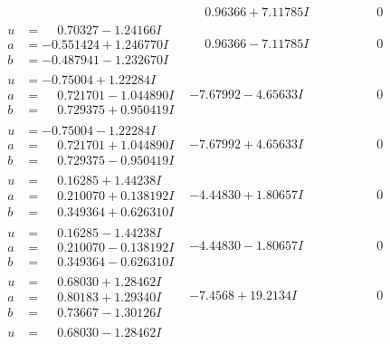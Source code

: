 \documentclass[1p]{elsarticle_modified}
\theoremstyle{definition}
\begin{document}
$$\begin{array}{c|c|c}
 & \phantom{-}0.96366 + 7.11785 I & \phantom{-0.000000 } 0 \\ \hline\begin{aligned}
u &= \phantom{-}0.70327 - 1.24166 I \\
a &= -0.551424 + 1.246770 I \\
b &= -0.487941 - 1.232670 I\end{aligned}
 & \phantom{-}0.96366 - 7.11785 I & \phantom{-0.000000 } 0 \\ \hline\begin{aligned}
u &= -0.75004 + 1.22284 I \\
a &= \phantom{-}0.721701 - 1.044890 I \\
b &= \phantom{-}0.729375 + 0.950419 I\end{aligned}
 & -7.67992 - 4.65633 I & \phantom{-0.000000 } 0 \\ \hline\begin{aligned}
u &= -0.75004 - 1.22284 I \\
a &= \phantom{-}0.721701 + 1.044890 I \\
b &= \phantom{-}0.729375 - 0.950419 I\end{aligned}
 & -7.67992 + 4.65633 I & \phantom{-0.000000 } 0 \\ \hline\begin{aligned}
u &= \phantom{-}0.16285 + 1.44238 I \\
a &= \phantom{-}0.210070 + 0.138192 I \\
b &= \phantom{-}0.349364 + 0.626310 I\end{aligned}
 & -4.44830 + 1.80657 I & \phantom{-0.000000 } 0 \\ \hline\begin{aligned}
u &= \phantom{-}0.16285 - 1.44238 I \\
a &= \phantom{-}0.210070 - 0.138192 I \\
b &= \phantom{-}0.349364 - 0.626310 I\end{aligned}
 & -4.44830 - 1.80657 I & \phantom{-0.000000 } 0 \\ \hline\begin{aligned}
u &= \phantom{-}0.68030 + 1.28462 I \\
a &= \phantom{-}0.80183 + 1.29340 I \\
b &= \phantom{-}0.73667 - 1.30126 I\end{aligned}
 & -7.4568 + 19.2134 I & \phantom{-0.000000 } 0 \\ \hline\begin{aligned}
u &= \phantom{-}0.68030 - 1.28462 I \\

\end{aligned}
\end{array}$$
\end{document}
